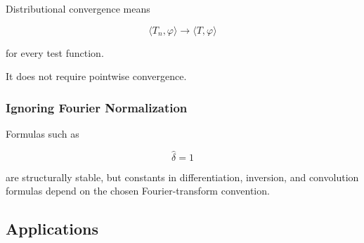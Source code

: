 Distributional convergence means

\[
\boxed{
\langle T_n,\varphi\rangle
\to
\langle T,\varphi\rangle
}
\]

for every test function.

It does not require pointwise convergence.

\subsubsection{Ignoring Fourier Normalization}

Formulas such as

\[
\widehat{\delta}=1
\]

are structurally stable, but constants in differentiation, inversion,
and convolution formulas depend on the chosen Fourier-transform
convention.

\subsection{Applications}
\label{subsec:distribution-theory-applications}


